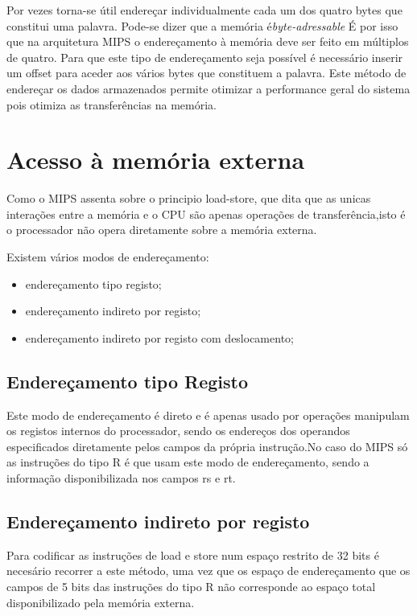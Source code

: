 \documentclass[10pt,a4paper]{book}
\begin{document}
    Por vezes torna-se útil endereçar individualmente cada um dos quatro bytes que constitui uma palavra. Pode-se dizer que a memória é\textit{byte-adressable}
    É por isso que na arquitetura MIPS o endereçamento à memória deve ser feito em múltiplos de quatro.
    Para que este tipo de endereçamento seja possível é necessário inserir um offset para aceder aos vários bytes que constituem a palavra.
    Este método de endereçar os dados armazenados permite otimizar a performance geral do sistema pois otimiza as transferências na memória.


		\section{Acesso à memória externa}

			Como o MIPS assenta sobre o principio load-store, que dita que as unicas interações entre a memória e o CPU são apenas  operações de transferência,isto é o processador não opera diretamente sobre a memória externa.

		Existem vários modos de endereçamento:
		\begin{itemize}
		  \item endereçamento tipo registo;
			\item endereçamento indireto por registo;
			\item endereçamento indireto por registo com deslocamento;
		\end{itemize}

		\subsection{Endereçamento tipo Registo}
			Este modo de endereçamento é direto e é apenas usado por operações manipulam os registos internos do processador, sendo os endereços dos operandos especificados diretamente pelos campos da própria instrução.No caso do MIPS só as instruções do tipo R é que usam este modo de endereçamento, sendo a informação disponibilizada nos campos rs e rt.

	 \subsection{Endereçamento indireto por registo}

	 		Para codificar as instruções de load e store num espaço restrito de 32 bits é necesário recorrer a este método, uma vez que os espaço de endereçamento que os campos de 5 bits das instruções do tipo R não corresponde ao espaço total disponibilizado pela memória externa.
\end{document}
